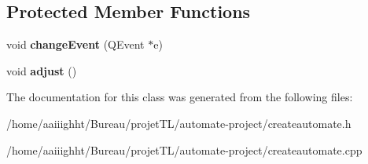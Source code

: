 \subsection*{Protected Member Functions}
\begin{DoxyCompactItemize}
\item 
\hypertarget{class_create_automate_acae0d3eabf60d2ae32f75ad11aa59be6}{void {\bfseries change\-Event} (Q\-Event $\ast$e)}\label{class_create_automate_acae0d3eabf60d2ae32f75ad11aa59be6}

\item 
\hypertarget{class_create_automate_aad4103629c0487ca511f43502c290be0}{void {\bfseries adjust} ()}\label{class_create_automate_aad4103629c0487ca511f43502c290be0}

\end{DoxyCompactItemize}


The documentation for this class was generated from the following files\-:\begin{DoxyCompactItemize}
\item 
/home/aaiiighht/\-Bureau/projet\-T\-L/automate-\/project/createautomate.\-h\item 
/home/aaiiighht/\-Bureau/projet\-T\-L/automate-\/project/createautomate.\-cpp\end{DoxyCompactItemize}
